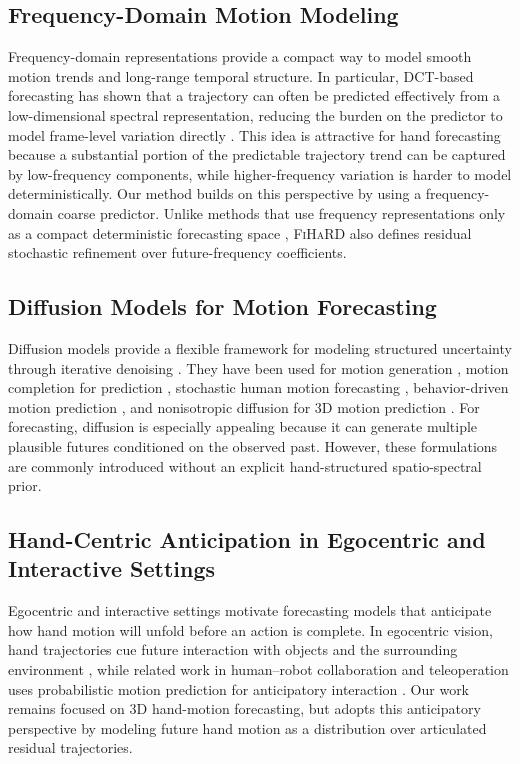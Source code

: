 \documentclass[runningheads]{llncs}
\newcommand{\modelname}{\textsc{FiHaRD}}
\begin{document}
\subsection{Frequency-Domain Motion Modeling}

Frequency-domain representations provide a compact way to model smooth motion trends and long-range temporal structure. In particular, DCT-based forecasting has shown that a trajectory can often be predicted effectively from a low-dimensional spectral representation, reducing the burden on the predictor to model frame-level variation directly \cite{Guo2023SiMLPe}. This idea is attractive for hand forecasting because a substantial portion of the predictable trajectory trend can be captured by low-frequency components, while higher-frequency variation is harder to model deterministically. Our method builds on this perspective by using a frequency-domain coarse predictor. Unlike methods that use frequency representations only as a compact deterministic forecasting space \cite{Guo2023SiMLPe}, \modelname{} also defines residual stochastic refinement over future-frequency coefficients.

\subsection{Diffusion Models for Motion Forecasting}

Diffusion models provide a flexible framework for modeling structured uncertainty through iterative denoising \cite{Ho2020DDPM,Song2021DDIM,Salimans2022ProgressiveDistillation}. They have been used for motion generation \cite{Tevet2023MDM}, motion completion for prediction \cite{Chen2023HumanMAC}, stochastic human motion forecasting \cite{Sun2024CoMusion}, behavior-driven motion prediction \cite{barquero2023belfusion}, and nonisotropic diffusion for 3D motion prediction \cite{Curreli2025SkeletonDiffusion}. For forecasting, diffusion is especially appealing because it can generate multiple plausible futures conditioned on the observed past. However, these formulations are commonly introduced without an explicit hand-structured spatio-spectral prior. 

\subsection{Hand-Centric Anticipation in Egocentric and Interactive Settings}

Egocentric and interactive settings motivate forecasting models that anticipate how hand motion will unfold before an action is complete. In egocentric vision, hand trajectories cue future interaction with objects and the surrounding environment \cite{Bao2023USST,Chen2025EgoMAN}, while related work in human--robot collaboration and teleoperation uses probabilistic motion prediction for anticipatory interaction \cite{Kothari2023ConstrainedHRCMotionPrediction,Heman2026TeleoperationIntent}. Our work remains focused on 3D hand-motion forecasting, but adopts this anticipatory perspective by modeling future hand motion as a distribution over articulated residual trajectories.
\end{document}
